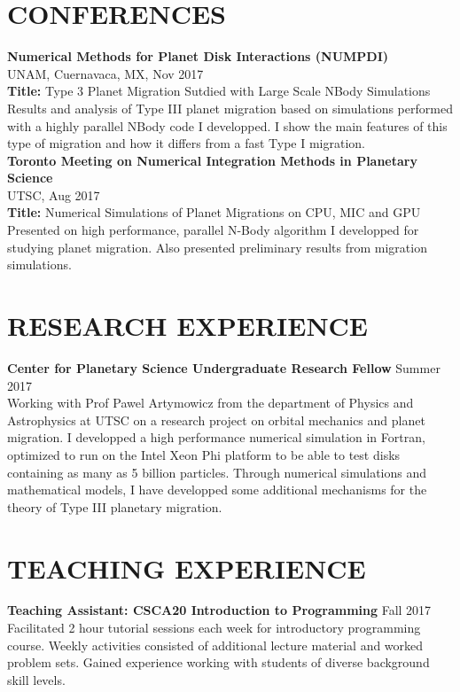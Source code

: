 \documentclass[line, margin]{res}
\begin{document}
\begin{resume}
    \section{CONFERENCES}
  \textbf{Numerical Methods for Planet Disk Interactions (NUMPDI)} \\ 
  UNAM, Cuernavaca, MX, Nov 2017 \\ [7pt]
  \textbf{Title:} Type 3 Planet Migration Sutdied with Large Scale NBody Simulations \\ [7pt]
  Results and analysis of Type III planet migration based on simulations performed with a highly parallel NBody code I developped. I show the main features of this type of migration and how it differs from a fast Type I migration. \\ [7pt]
  \textbf{Toronto Meeting on Numerical Integration Methods in Planetary Science} \\
  UTSC, Aug 2017 \\[7pt]
  \textbf{Title:} Numerical Simulations of Planet Migrations on CPU, MIC and GPU \\ [7pt]
  Presented on high performance, parallel N-Body algorithm I developped for studying planet migration. Also presented preliminary results from migration simulations. \\ [7pt]

  \section{RESEARCH EXPERIENCE}
  \textbf{Center for Planetary Science Undergraduate Research Fellow} \hfill Summer 2017 \\ [7pt]
    Working with Prof Pawel Artymowicz from the department of Physics and Astrophysics at UTSC on a research project 
    on orbital mechanics and planet migration. I developped a high performance numerical simulation in Fortran, 
    optimized to run on the Intel Xeon Phi platform to be able to test disks containing as many as 5 billion particles. 
    Through numerical simulations and mathematical models, I have developped some additional mechanisms for 
    the theory of Type III planetary migration.

  \section{TEACHING EXPERIENCE}
  \textbf{Teaching Assistant: CSCA20 Introduction to Programming} \hfill Fall 2017 \\ [7pt]
    Facilitated 2 hour tutorial sessions each week for introductory programming course.
    Weekly activities consisted of additional lecture material and worked problem sets.
    Gained experience working with students of diverse background skill levels.


\end{resume}
\end{document}
